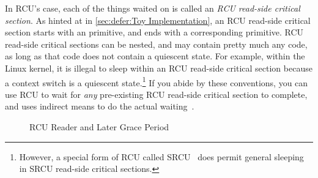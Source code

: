 In RCU's case, each of the things waited on is called an
\emph{RCU read-side critical section}.
As hinted at in
\cref{sec:defer:Toy Implementation}, an RCU read-side critical
section starts with an  primitive, and ends with a
corresponding  primitive.
RCU read-side critical sections can be nested, and may contain pretty
much any code, as long as that code does not contain a quiescent state.
For example, within the Linux kernel, it is illegal to sleep within
an RCU read-side critical section because a context switch is a quiescent
state.\footnote{
	However, a special form of RCU called SRCU~\cite{PaulEMcKenney2006c}
	does permit general sleeping in SRCU read-side critical sections.}
If you abide by these conventions, you can use RCU to wait for \emph{any}
pre-existing RCU read-side critical section to complete, and
 uses indirect means to do the actual
waiting~\cite{MathieuDesnoyers2012URCU,McKenney:2013:SDS:2483852.2483867}.

\begin{figure}
\centering
{}
\caption{RCU Reader and Later Grace Period}
\label{fig:defer:RCU Reader and Later Grace Period}
\end{figure}

